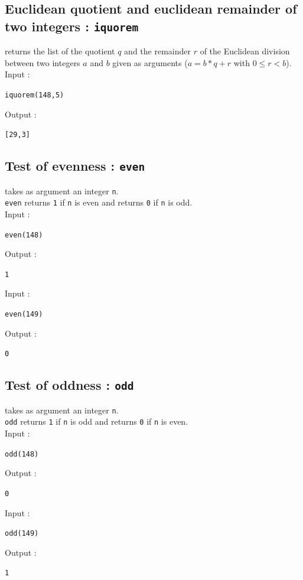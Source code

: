 \documentclass[a4paper,11pt]{book}
\begin{document}
\subsection{Euclidean quotient and euclidean remainder of two integers  : {\tt iquorem}}\label{sec:iquorem}
 returns the list of the quotient $q$ and the  
remainder $r$ of the Euclidean division between two integers $a$ and $b$ given
as arguments ($a=b*q+r$ with $0\leq r< b$).\\
Input :
\begin{center}{\tt iquorem(148,5) }\end{center}
Output :
\begin{center}{\tt [29,3] }\end{center}

\subsection{Test of evenness : {\tt even}}
 takes as argument an integer {\tt n}.\\
{\tt even} returns {\tt 1} if {\tt n} is even and  returns {\tt 0} if {\tt n} 
is odd.\\
Input :
\begin{center}{\tt even(148) }\end{center}
Output :
\begin{center}{\tt 1 }\end{center}
Input :
\begin{center}{\tt even(149) }\end{center}
Output :
\begin{center}{\tt 0}\end{center}


\subsection{Test of oddness : {\tt odd}}
 takes as argument an integer {\tt n}.\\
{\tt odd} returns {\tt 1} if {\tt n} is odd and returns {\tt 0} if {\tt n} is
even.\\
Input :
\begin{center}{\tt odd(148) }\end{center}
Output :
\begin{center}{\tt 0 }\end{center}
Input :
\begin{center}{\tt odd(149) }\end{center}
Output :
\begin{center}{\tt 1}\end{center}
\end{document}
